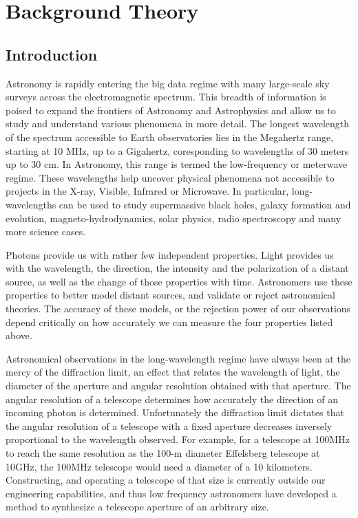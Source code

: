 \chapter{Background Theory}

\label{ch:background}

\section{Introduction}

Astronomy is rapidly entering the big data regime with many large-scale sky surveys across the electromagnetic spectrum. This breadth of information is poised to expand the frontiers of Astronomy and Astrophysics and allow us to study and understand various phenomena in more detail. The longest wavelength of the spectrum accessible to Earth observatories lies in the Megahertz range, starting at 10 MHz, up to a Gigahertz, coresponding to wavelengths of 30 meters up to 30 cm. In Astronomy, this range is termed the low-frequency or meterwave regime. These wavelengths help uncover physical phenomena not accessible to projects in the X-ray, Visible, Infrared or Microwave. In particular, long-wavelengths can be used to study supermassive black holes, galaxy formation and evolution, magneto-hydrodynamics, solar physics, radio spectroscopy and many more science cases.

Photons provide us with rather few independent properties. Light provides us with the wavelength, the direction, the intensity  and the polarization of a distant source, as well as the change of those properties with time. Astronomers use these properties to better model distant sources, and validate or reject astronomical theories. The accuracy of these models, or the rejection power of our observations depend critically on how accurately we can measure the four properties listed above. 

Astronomical observations in the long-wavelength regime have always been at the mercy of the diffraction limit, an effect that relates the wavelength of light, the diameter of the aperture and angular resolution obtained with that aperture. The angular resolution of a telescope determines how accurately the direction of an incoming photon is determined. Unfortunately the diffraction limit dictates that the angular resolution of a telescope with a fixed aperture decreases inversely proportional to the wavelength observed. For example, for a telescope at 100MHz to reach the same resolution as the 100-m diameter Effelsberg telescope at 10GHz, the 100MHz telescope would need a diameter of a 10 kilometers. Constructing, and operating a telescope of that size is currently outside our engineering capabilities, and thus low frequency astronomers have developed a method to synthesize a telescope aperture of an arbitrary size. 

